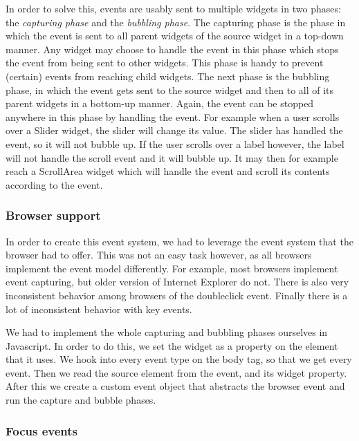\documentclass[11pt,a4paper]{article}
\begin{document}
In order to solve this, events are usably sent to multiple widgets in two phases: the \textit{capturing phase} and the \textit{bubbling phase}.
The capturing phase is the phase in which the event is sent to all parent widgets of the source widget in a top-down manner.
Any widget may choose to handle the event in this phase which stops the event from being sent to other widgets.
This phase is handy to prevent (certain) events from reaching child widgets.
The next phase is the bubbling phase, in which the event gets sent to the source widget and then to all of its parent widgets in a bottom-up manner.
Again, the event can be stopped anywhere in this phase by handling the event.
For example when a user scrolls over a Slider widget, the slider will change its value.
The slider has handled the event, so it will not bubble up.
If the user scrolls over a label however, the label will not handle the scroll event and it will bubble up.
It may then for example reach a ScrollArea widget which will handle the event and scroll its contents according to the event.

\subsubsection{Browser support}

In order to create this event system, we had to leverage the event system that the browser had to offer.
This was not an easy task however, as all browsers implement the event model differently.
For example, most browsers implement event capturing, but older version of Internet Explorer do not.
There is also very inconsistent behavior among browsers of the doubleclick event.
Finally there is a lot of inconsistent behavior with key events.

We had to implement the whole capturing and bubbling phases ourselves in Javascript.
In order to do this, we set the widget as a property on the element that it uses.
We hook into every event type on the body tag, so that we get every event.
Then we read the source element from the event, and its widget property.
After this we create a custom event object that abstracts the browser event and run the capture and bubble phases.

\subsubsection{Focus events}
\end{document}
